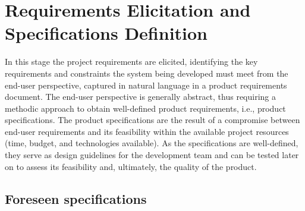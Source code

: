 \chapter{Requirements Elicitation and Specifications Definition}%
\label{ch:requirements-specs}
In this stage the project requirements are elicited, identifying the key
requirements and constraints the system being developed must meet from the
end-user perspective, captured in natural language in a product requirements
document. The end-user perspective is generally abstract, thus requiring a
methodic approach to obtain well-defined product requirements, i.e., product
specifications. The product specifications are the result of a compromise
between end-user requirements and its feasibility within the available project
resources (time, budget, and technologies available). As the specifications are
well-defined, they serve as design guidelines for the development team and can
be tested later on to assess its feasibility and, ultimately, the quality of the product.
%
%
\section{Foreseen specifications}%
\label{sec:fores-spec}

%

